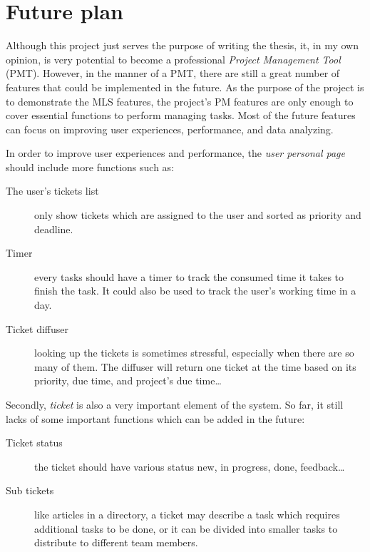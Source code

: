 
\chapter{Future plan} %

\label{ch:future_plan} %

Although this project just serves the purpose of writing the thesis, it, in my own opinion, is very potential to become a professional \emph{Project Management Tool} (PMT).
However, in the manner of a PMT, there are still a great number of features that could be implemented in the future.
As the purpose of the project is to demonstrate the MLS features, the project's PM features are only enough to cover essential functions to perform managing tasks.
Most of the future features can focus on improving user experiences, performance, and data analyzing.

In order to improve user experiences and performance, the \emph{user personal page} should include more functions such as:
\begin{description}
\item[The user's tickets list] only show tickets which are assigned to the user and sorted as priority and deadline.
\item[Timer] every tasks should have a timer to track the consumed time it takes to finish the task.
It could also be used to track the user's working time in a day.
\item[Ticket diffuser] looking up the tickets is sometimes stressful, especially when there are so many of them.
The diffuser will return one ticket at the time based on its priority, due time, and project's due time\dots
\end{description}

Secondly, \emph{ticket} is also a very important element of the system.
So far, it still lacks of some important functions which can be added in the future:
\begin{description}
\item[Ticket status] the ticket should have various status \eg new, in progress, done, feedback\dots
\item[Sub tickets] like articles in a directory, a ticket may describe a task which requires additional tasks to be done, or it can be divided into smaller tasks to distribute to different team members.
\end{description}

